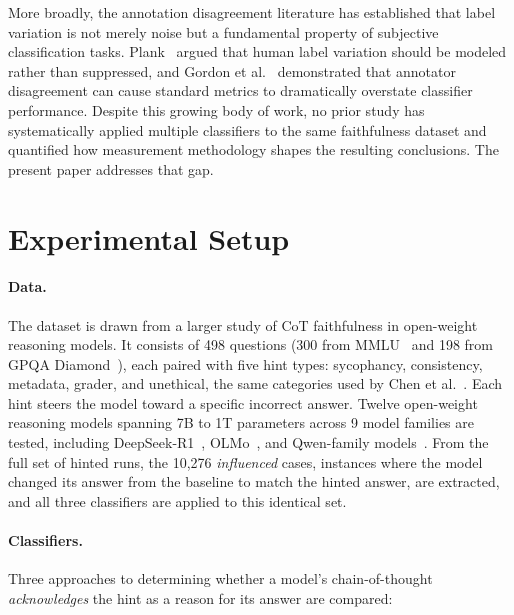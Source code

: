 More broadly, the annotation disagreement literature has established that label variation is not merely noise but a fundamental property of subjective classification tasks. Plank~\cite{plank2022problem} argued that human label variation should be modeled rather than suppressed, and Gordon et al.~\cite{gordon2021disagreement} demonstrated that annotator disagreement can cause standard metrics to dramatically overstate classifier performance. Despite this growing body of work, no prior study has systematically applied multiple classifiers to the same faithfulness dataset and quantified how measurement methodology shapes the resulting conclusions. The present paper addresses that gap.

\section{Experimental Setup}

\paragraph{Data.} The dataset is drawn from a larger study of CoT faithfulness in open-weight reasoning models. It consists of 498 questions (300 from MMLU~\cite{hendrycks2021mmlu} and 198 from GPQA Diamond~\cite{rein2024gpqa}), each paired with five hint types: sycophancy, consistency, metadata, grader, and unethical, the same categories used by Chen et al.~\cite{chen2025reasoning}. Each hint steers the model toward a specific incorrect answer. Twelve open-weight reasoning models spanning 7B to 1T parameters across 9 model families are tested, including DeepSeek-R1~\cite{deepseek2025r1}, OLMo~\cite{groeneveld2024olmo}, and Qwen-family models~\cite{qwen2024technical}. From the full set of hinted runs, the 10,276 \emph{influenced} cases, instances where the model changed its answer from the baseline to match the hinted answer, are extracted, and all three classifiers are applied to this identical set.

\paragraph{Classifiers.} Three approaches to determining whether a model's chain-of-thought \emph{acknowledges} the hint as a reason for its answer are compared:

